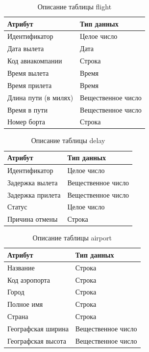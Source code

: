 \begin{table}[H]
    \centering
    \captionsetup{justification=centering}
    \caption{Описание таблицы flight}
    \begin{tabular}{|p{}|p{}|}
        \hline
        Атрибут & Тип данных \\
        \hline
        Идентификатор & Целое число \\
        Дата вылета & Дата \\
        Код авиакомпании & Строка \\
        Время вылета & Время \\
        Время прилета & Время \\
        Длина пути (в милях) & Вещественное число \\
        Время в пути & Вещественное число \\
        Номер борта & Строка \\
        \hline
    \end{tabular}
    \label{tab:tabl1}
\end{table}

\begin{table}[H]
    \centering
    \captionsetup{justification=centering}
    \caption{Описание таблицы delay}
    \begin{tabular}{|p{}|p{}|}
        \hline
        Атрибут & Тип данных \\
        \hline
        Идентификатор & Целое число \\
        Задержка вылета & Вещественное число \\
        Задержка прилета & Вещественное число \\
        Статус & Целое число \\
        Причина отмены & Строка \\
        \hline
    \end{tabular}
    \label{tab:tabl2}
\end{table}

\begin{table}[H]
    \centering
    \captionsetup{justification=centering}
    \caption{Описание таблицы airport}
    \begin{tabular}{|p{}|p{}|}
        \hline
        Атрибут & Тип данных \\
        \hline
        Название & Строка \\
        Код аэропорта & Строка \\
        Город & Строка \\
        Полное имя & Строка \\
        Страна & Строка \\
        Географская ширина & Вещественное число \\
        Географская высота & Вещественное число \\
        \hline
    \end{tabular}
    \label{tab:tabl3}
\end{table}

